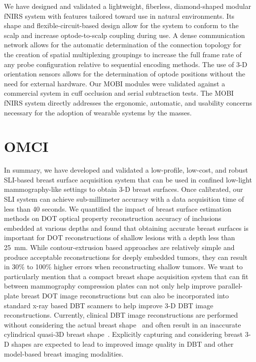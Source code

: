 We have designed and validated a lightweight, fiberless, diamond-shaped modular \ac{fNIRS} system with features tailored toward use in natural environments. Its shape and flexible-circuit-based design allow for the system to conform to the scalp and increase optode-to-scalp coupling during use. A dense communication network allows for the automatic determination of the connection topology for the creation of spatial multiplexing groupings to increase the full frame rate of any probe configuration relative to sequential encoding methods. The use of 3-D orientation sensors allows for the determination of optode positions without the need for external hardware. Our \ac{MOBI} modules were validated against a commercial system in cuff occlusion and serial subtraction tests. The \ac{MOBI} \ac{fNIRS} system directly addresses the ergonomic, automatic, and usability concerns necessary for the adoption of wearable systems by the masses. 

\section{OMCI}
In summary, we have developed and validated a low-profile, low-cost, and robust \ac{SLI}-based breast surface acquisition system that can be used in confined low-light mammography-like settings to obtain 3-D breast surfaces. Once calibrated, our \ac{SLI} system can achieve sub-millimeter accuracy with a data acquisition time of less than 40 seconds. We quantified the impact of breast surface estimation methods on \ac{DOT} optical property reconstruction accuracy of inclusions embedded at various depths and found that obtaining accurate breast surfaces is important for \ac{DOT} reconstructions of shallow lesions with a depth less than 25~mm. While contour-extrusion based approaches are relatively simple and produce acceptable reconstructions for deeply embedded tumors, they can result in 30\% to 100\% higher errors when reconstructing shallow tumors. We want to particularly mention that a compact breast shape acquisition system that can fit between mammography compression plates can not only help improve parallel-plate breast \ac{DOT} image reconstructions but can also be incorporated into standard x-ray based \ac{DBT} scanners to help improve 3-D \ac{DBT} image reconstructions. Currently, clinical \ac{DBT} image reconstructions are performed without considering the actual breast shape~\cite{Chong2019} and often result in an inaccurate cylindrical quasi-3D breast shape~\cite{Redbird2008}. Explicitly capturing and considering breast 3-D shapes are expected to lead to improved image quality in \ac{DBT} and other model-based breast imaging modalities.



